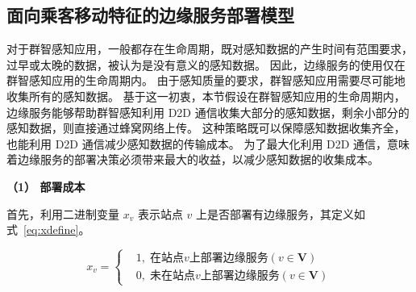 \begin{table}[!t]
\begin{tabular}{|c|p{10.5cm}|}
  \end{tabular}
\end{table}

\subsection{面向乘客移动特征的边缘服务部署模型}

对于群智感知应用，一般都存在生命周期，既对感知数据的产生时间有范围要求，过早或太晚的数据，被认为是没有意义的感知数据。
因此，边缘服务的使用仅在群智感知应用的生命周期内。
由于感知质量的要求，群智感知应用需要尽可能地收集所有的感知数据。
基于这一初衷，本节假设在群智感知应用的生命周期内，边缘服务能够帮助群智感知利用 D2D 通信收集大部分的感知数据，剩余小部分的感知数据，则直接通过蜂窝网络上传。
这种策略既可以保障感知数据收集齐全，也能利用 D2D 通信减少感知数据的传输成本。
为了最大化利用 D2D 通信，意味着边缘服务的部署决策必须带来最大的收益，以减少感知数据的收集成本。

\textbf{（1） 部署成本}

首先，利用二进制变量 $x_v$ 表示站点 $v$ 上是否部署有边缘服务，其定义如式~\eqref{eq:xdefine}。

\begin{equation}
\label{eq:xdefine}
x_v =\left\{
\begin{aligned}
&1, \; 在站点 v 上部署边缘服务 (v\in \boldsymbol{V})\\
&0, \; 未在站点 v 上部署边缘服务 (v\in \boldsymbol{V})
\end{aligned}
\right.
\end{equation}

